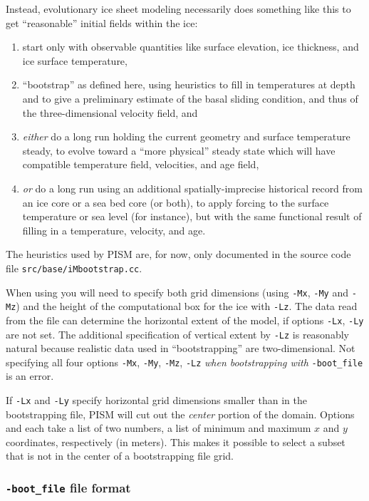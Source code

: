 \documentclass[titlepage,letterpaper,final]{scrartcl}
\begin{document}
Instead, evolutionary ice sheet modeling necessarily does something like this
to get ``reasonable'' initial fields within the ice:
\begin{enumerate}
\item start only with observable quantities like surface elevation, ice thickness, and ice surface temperature,
\item ``bootstrap'' as defined here, using heuristics to fill in temperatures at depth and to give a preliminary estimate of the basal sliding condition, and thus of the three-dimensional velocity field, and
\item \emph{either} do a long run holding the current geometry and surface temperature steady,  to evolve toward a ``more physical'' steady state which will have compatible temperature field, velocities, and age field,
\item \emph{or} do a long run using an additional spatially-imprecise historical record from an ice core or a sea bed core (or both), to apply forcing to the surface temperature or sea level (for instance), but with the same functional result of filling in a temperature, velocity, and age.
\end{enumerate}

The heuristics used by PISM are, for now, only documented in the source code file \texttt{src/base/iMbootstrap.cc}.

When using  you will need to specify both grid dimensions (using \texttt{-Mx}, \texttt{-My} and \texttt{-Mz}) and the height of the computational box for the ice with \texttt{-Lz}.  The data read from the file can determine the horizontal extent of the model, if options \texttt{-Lx}, \texttt{-Ly} are not set.  The additional specification of vertical extent by \texttt{-Lz} is reasonably natural because realistic data used in ``bootstrapping'' are two-dimensional.  Not specifying all four options \texttt{-Mx}, \texttt{-My}, \texttt{-Mz}, \texttt{-Lz} \emph{when bootstrapping with} \texttt{-boot_file} is an error.

If \texttt{-Lx} and \texttt{-Ly} specify horizontal grid dimensions smaller than in the bootstrapping file, PISM will cut out the \emph{center} portion of the domain. Options  and  each take a list of two numbers, a list of minimum and maximum $x$ and $y$ coordinates, respectively (in meters). This makes it possible to select a subset that is not in the center of a bootstrapping file grid.

\subsubsection*{\texttt{-boot_file} file format}
\label{sec:bootstrapping-format}
\end{document}
